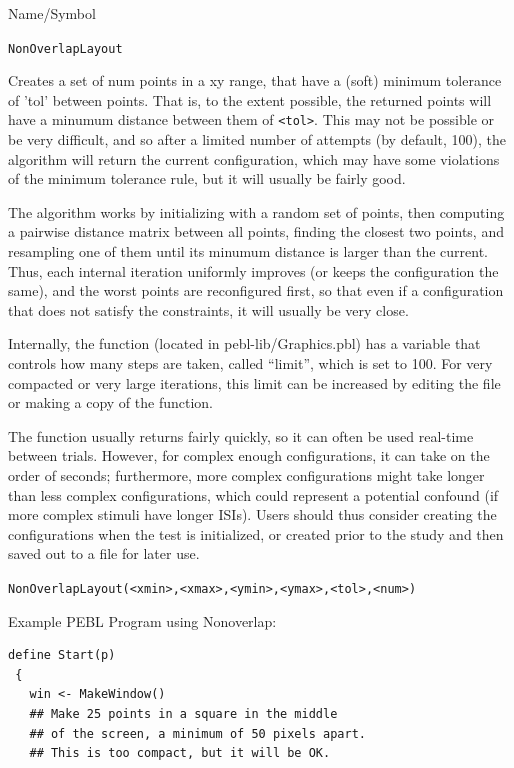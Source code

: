 \begin{desc}{Name/Symbol}
   
\item[Name/Symbol] \verb+NonOverlapLayout+

\item[Description]        Creates a set of num points in a xy range, that have a (soft) minimum tolerance of 'tol' between points.  That is, to the extent possible, the returned points will have a minumum distance between them of \verb+<tol>+.  This may not be possible or be very difficult, and so after a limited number of attempts (by default, 100), the algorithm will return the current configuration, which may have some violations of the minimum tolerance rule, but it will usually be fairly good.  

The algorithm works by initializing with a random set of points, then computing a pairwise distance matrix between all points, finding the closest two points, and resampling one of them until its minumum distance is larger than the current.  Thus, each internal iteration uniformly improves (or keeps the configuration the same), and the worst points are reconfigured first, so that even if a configuration that does not satisfy the constraints, it will usually be very close.

Internally, the function (located in pebl-lib/Graphics.pbl) has a variable that controls how many steps are taken, called ``limit'', which is set to 100.  For very compacted or very large iterations, this limit can be increased by editing the file or making a copy of the function.  

The function usually returns fairly quickly, so it can often be used real-time between trials.  However, for complex enough configurations, it can take on the order of seconds; furthermore, more  complex configurations might take longer than less complex configurations, which could represent a potential confound (if more complex stimuli have longer ISIs).  Users should thus consider creating the configurations when the test is initialized, or created prior to the study and then saved out to a file for later use.


\newpage

\item[Usage]       
\verb+NonOverlapLayout(<xmin>,<xmax>,<ymin>,<ymax>,<tol>,<num>)+

\item[Example]

Example PEBL Program using Nonoverlap:
\begin{verbatim}
define Start(p)
 {
   win <- MakeWindow()  
   ## Make 25 points in a square in the middle 
   ## of the screen, a minimum of 50 pixels apart.  
   ## This is too compact, but it will be OK.


\end{verbatim}
\end{desc}
